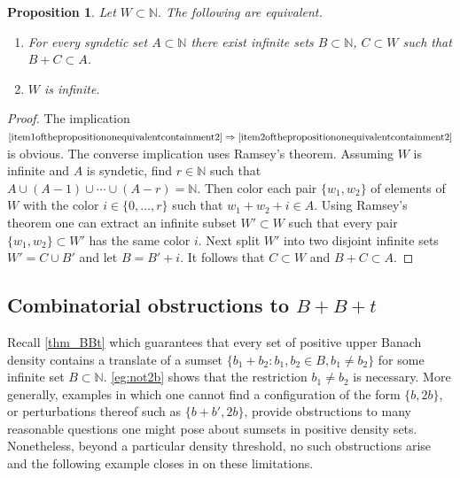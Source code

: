 \documentclass[10pt,dvipsnames]{article}
\newtheorem{proposition}[theorem]{Proposition}
\theoremstyle{definition}
\theoremstyle{plain}
\newcommand{\N}{\mathbb{N}}
\begin{document}
\begin{proposition}
\label{prop:syndetic-sum}
Let $W\subset\N$. 
The following are equivalent.
\begin{enumerate}
\item
\label{item1ofthepropositiononequivalentcontainment2}
For every syndetic set $A\subset\N$ there exist infinite sets $B\subset\N$, $C\subset W$ such that $B+C\subset A$.
\item
\label{item2ofthepropositiononequivalentcontainment2}
$W$ is infinite.
\end{enumerate}
\end{proposition}
\begin{proof}
The implication
$
\eqref{item1ofthepropositiononequivalentcontainment2}
\Rightarrow
\eqref{item2ofthepropositiononequivalentcontainment2}
$
is obvious.
The converse implication uses Ramsey's theorem.
Assuming $W$ is infinite and $A$ is syndetic, find $r\in\N$ such that $A\cup(A-1)\cup\cdots\cup(A-r)=\N$.
Then color each pair $\{w_1,w_2\}$ of elements of $W$ with the color $i\in\{0,\dots,r\}$ such that $w_1+w_2+i\in A$.
Using Ramsey's theorem one can extract an infinite subset $W'\subset W$ such that every pair $\{w_1,w_2\}\subset W'$ has the same color $i$.
Next split $W'$ into two disjoint infinite sets $W'=C\cup B'$ and let $B=B'+i$.
It follows that $C\subset W$ and $B+C\subset A$.
\end{proof}


\subsection{Combinatorial obstructions to $B+B+t$}
Recall \cref{thm_BBt} which guarantees that every set of positive upper Banach density contains a translate of a 
sumset $\{b_1+b_2:b_1,b_2\in B,b_1\neq b_2\}$ for some infinite set $B\subset\N$.
\cref{eg:not2b} shows that the restriction $b_1 \ne b_2$ is necessary.
More generally, examples in which one cannot find a configuration of the form $\{b ,2b\}$, or perturbations thereof such as  $\{b + b', 2b \}$, provide obstructions to many reasonable questions one might pose about sumsets in positive density sets. 
Nonetheless, beyond a particular density threshold, no such obstructions arise and the following example closes in on these limitations.
\end{document}
